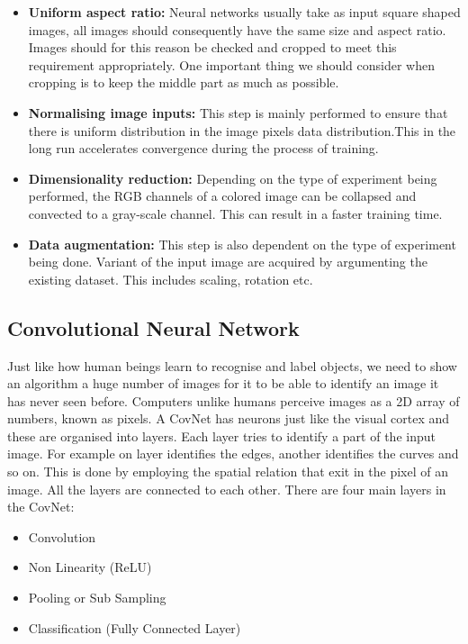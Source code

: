 \documentclass[12pt, a4paper,oneside]{report}
\begin{document}
\begin{itemize}
	
	\item \textbf{Uniform aspect ratio:}  Neural networks usually take as input square shaped images, all images should consequently have the same size and aspect ratio. Images should for this reason be checked and cropped to meet this requirement appropriately. One important thing we should consider when cropping is to keep the middle part as much as possible.
	
	\item \textbf{Normalising image inputs:} This step is mainly performed to ensure that there is uniform distribution in the image pixels data distribution.This in the long run accelerates convergence during the process of training. 

	\item \textbf{Dimensionality reduction:} Depending on the type of experiment being performed, the RGB channels of a colored image can be collapsed and convected to a gray-scale channel. This can result in a faster training time.
	
	\item \textbf{Data augmentation:} This step is also dependent on the type of experiment being done. Variant of the input image are acquired by argumenting the existing dataset. This includes scaling, rotation etc.
		
\end{itemize} 



\subsection{Convolutional Neural Network}
Just like how human beings learn to recognise and label objects, we need to show an algorithm a huge number of images for it to be able to identify an image it has never seen before. Computers unlike humans perceive images as a 2D array of numbers, known as pixels. A CovNet has neurons just like the visual cortex and these are organised into layers. Each layer tries to identify a part of the input image. For example on layer identifies the edges, another identifies the curves and so on. This is done by employing the spatial relation that exit in the pixel of an image. All the layers are connected to each other. There are four main layers in the CovNet:

\begin{itemize}
	\item Convolution
	\item Non Linearity (ReLU)
	\item Pooling or Sub Sampling
	\item Classification (Fully Connected Layer)
\end{itemize} 
\end{document}
